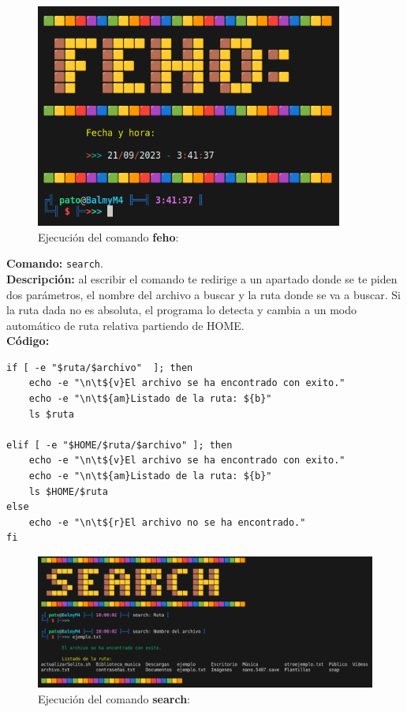 \documentclass[titlepage]{article}
\begin{document}
\begin{figure}[H]
    \centering
    \includegraphics[width=0.9\textwidth]{feho.png}
    \caption{Ejecución del comando \textbf{feho}:}
    \label{fig:ejemplo}
\end{figure}

\newpage
\noindent
\textbf{Comando:} \verb|search|. \\
\textbf{Descripción:} al escribir el comando te redirige a un apartado donde se te piden dos parámetros, el nombre del archivo a buscar y la ruta donde se va a buscar. Si la ruta dada no es absoluta, el programa lo detecta y cambia a un modo automático de ruta relativa partiendo de HOME.\\

\noindent
\textbf{Código:}
\begin{lstlisting}
if [ -e "$ruta/$archivo"  ]; then
    echo -e "\n\t${v}El archivo se ha encontrado con exito."
    echo -e "\n\t${am}Listado de la ruta: ${b}"
    ls $ruta

elif [ -e "$HOME/$ruta/$archivo" ]; then
    echo -e "\n\t${v}El archivo se ha encontrado con exito."
    echo -e "\n\t${am}Listado de la ruta: ${b}"
    ls $HOME/$ruta
else
    echo -e "\n\t${r}El archivo no se ha encontrado."
fi
\end{lstlisting}

\begin{figure}[H]
    \centering
    \includegraphics[width=1\textwidth]{search.png}
    \caption{Ejecución del comando \textbf{search}:}
    \label{fig:ejemplo}
\end{figure}
\end{document}
